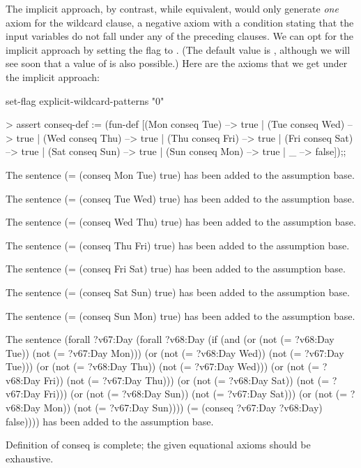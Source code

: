 The implicit approach, by contrast, while equivalent, would
only generate {\em one\/} axiom for the wildcard clause, 
a negative axiom with a condition stating that the input
variables do not fall under any of the preceding clauses. 
We can opt for the implicit approach 
by setting the flag  to 
. (The default value is , although we will
see soon that a value of  is also possible.)
Here are the axioms that we get under the implicit approach: 
\begin{tcAthena}
set-flag explicit-wildcard-patterns "0" 

> assert conseq-def :=
    (fun-def [(Mon conseq Tue) --> true
            | (Tue conseq Wed) --> true
            | (Wed conseq Thu) --> true
            | (Thu conseq Fri) --> true
            | (Fri conseq Sat) --> true
            | (Sat conseq Sun) --> true
            | (Sun conseq Mon) --> true
            | _ --> false]);;

The sentence 
(= (conseq Mon Tue)
   true)
has been added to the assumption base.

The sentence 
(= (conseq Tue Wed)
   true)
has been added to the assumption base.

The sentence 
(= (conseq Wed Thu)
   true)
has been added to the assumption base.

The sentence 
(= (conseq Thu Fri)
   true)
has been added to the assumption base.

The sentence 
(= (conseq Fri Sat)
   true)
has been added to the assumption base.

The sentence 
(= (conseq Sat Sun)
   true)
has been added to the assumption base.

The sentence 
(= (conseq Sun Mon)
   true)
has been added to the assumption base.

The sentence 
(forall ?v67:Day
  (forall ?v68:Day
    (if (and (or (not (= ?v68:Day Tue))
                 (not (= ?v67:Day Mon)))
             (or (not (= ?v68:Day Wed))
                 (not (= ?v67:Day Tue)))
             (or (not (= ?v68:Day Thu))
                 (not (= ?v67:Day Wed)))
             (or (not (= ?v68:Day Fri))
                 (not (= ?v67:Day Thu)))
             (or (not (= ?v68:Day Sat))
                 (not (= ?v67:Day Fri)))
             (or (not (= ?v68:Day Sun))
                 (not (= ?v67:Day Sat)))
             (or (not (= ?v68:Day Mon))
                 (not (= ?v67:Day Sun))))
        (= (conseq ?v67:Day ?v68:Day)
           false))))
has been added to the assumption base.

Definition of conseq is complete; the given equational axioms should be exhaustive.
\end{tcAthena}
